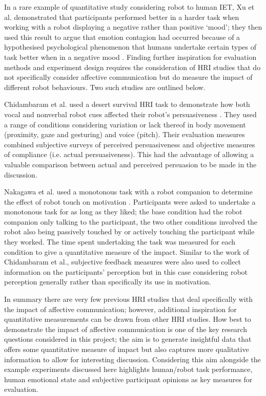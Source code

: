 \documentclass[11pt,a4paper]{report}
\begin{document}
In a rare example of quantitative study considering robot to human IET, Xu et al. demonstrated that participants performed better in a harder task when working with a robot displaying a negative rather than positive `mood'; they then used this result to argue that emotion contagion had occurred because of a hypothesised psychological phenomenon that humans undertake certain types of task better when in a negative mood \cite{xu2014robot}. Finding further inspiration for evaluation methods and experiment design requires the consideration of HRI studies that do not specifically consider affective communication but do measure the impact of different robot behaviours. Two such studies are outlined below.

Chidambaram et al. used a desert survival HRI task to demonstrate how both vocal and nonverbal robot cues affected their robot's persuasiveness \cite{chidambaram2012designing}. They used a range of conditions considering variation or lack thereof in body movement (proximity, gaze and gesturing) and voice (pitch). Their evaluation measures combined subjective surveys of perceived persuasiveness and objective measures of compliance (i.e. actual persuasiveness). This had the advantage of allowing a valuable comparison between actual and perceived persuasion to be made in the discussion. 

Nakagawa et al. used a monotonous task with a robot companion to determine the effect of robot touch on motivation \cite{nakagawa2011effect}. Participants were asked to undertake a monotonous task for as long as they liked; the base condition had the robot companion only talking to the participant, the two other conditions involved the robot also being passively touched by or actively touching the participant while they worked. The time spent undertaking the task was measured for each condition to give a quantitative measure of the impact. Similar to the work of Chidambaram et al., subjective feedback measures were also used to collect information on the participants' perception but in this case considering robot perception generally rather than specifically its use in motivation. 

In summary there are very few previous HRI studies that deal specifically with the impact of affective communication; however, additional inspiration for quantitative measurements can be drawn from other HRI studies. How best to demonstrate the impact of affective communication is one of the key research questions considered in this project; the aim is to generate insightful data that offers some quantitative measure of impact but also captures more qualitative information to allow for interesting discussion. Considering this aim alongside the example experiments discussed here highlights human/robot task performance, human emotional state and subjective participant opinions as key measures for evaluation.
\end{document}
